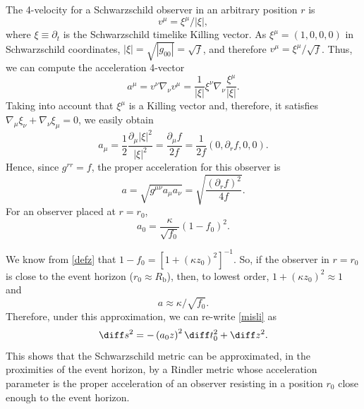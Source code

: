 The 4-velocity for a Schwarzschild observer in an arbitrary position $r$
is
\begin{equation}
v^\mu= {\xi^\mu}/{|\xi|},
\end{equation}
where $\xi\equiv\partial_t$ is the Schwarzschild timelike Killing vector.
As $\xi^\mu=(1,0,0,0)$ in Schwarzschild coordinates, 
$|\xi|=\sqrt{|g_{00}|}=\sqrt{f}$, and therefore
$v^\mu=\xi^\mu/\sqrt{f}$. Thus, we can compute the acceleration
4-vector
\begin{equation}
a^\mu=v^\nu\nabla_\nu v^\mu=\frac{1}{|\xi|}\xi^\nu\nabla_\nu
 \frac{\xi^\mu}{|\xi|} .
\end{equation}
Taking into account that $\xi^\mu$ is a Killing vector and, therefore, it
satisfies $\nabla_\mu\xi_\nu+\nabla_\nu\xi_\mu=0$, we easily obtain
\begin{equation}
a_\mu=\frac12\frac{\partial_\mu|\xi|^2}{|\xi|^2} =
 \frac{\partial_\mu f}{2f}=\frac{1}{2f}\left(0,\partial_r f ,0,0\right).
\end{equation}
Hence, since $g^{rr}=f$, the   proper acceleration for this observer is
\begin{equation}\label{properpropera}
a=\sqrt{g^{\mu\nu}a_\mu a_\nu}=\sqrt{\frac{(\partial_r f)^2}{4f} } .
\end{equation}
For an observer placed at $r=r_0$,
\begin{equation}\label{properpropera3}
a_0=\frac{\kappa}{\sqrt{f_0}}(1-f_0)^2.
\end{equation}

We know from \eqref{defz} that $1-f_0=[1+(\kappa z_0)^2]^{-1}$. So,
if the observer in $r=r_0$ is close to the event horizon ($r_0\approx
R_{\text{b}}$), then, to lowest order, $1+(\kappa z_0)^2\approx 1$ and
\begin{equation}\label{properproperaf}
a\approx {\kappa}/{\sqrt{f_0}}.
\end{equation}
Therefore, under this approximation, we can re-write \eqref{misli} as
\begin{equation}\label{Rindleradapt}
\diff s^2=-\left(a_0 z\right)^2\diff t_0^2+\diff z^2.
\end{equation}
This shows that the Schwarzschild metric can be approximated, in the
proximities of the event horizon, by a Rindler metric whose acceleration
parameter is the proper acceleration of an observer resisting in a position
$r_0$ close enough to the event horizon.

